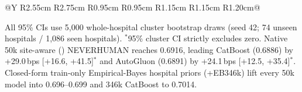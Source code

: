 \begin{table}[t]
\begin{tabularx}{\textwidth}{@{}Y R{2.55cm} R{2.75cm} R{0.95cm} R{0.95cm} R{1.15cm} R{1.15cm} R{1.20cm}@{}}
\bottomrule
\end{tabularx}
\vspace{2pt}
{\raggedright\sffamily\fontsize{6.8}{8.5}\selectfont\color{sub}All 95\% CIs use 5,000 whole-hospital cluster bootstrap draws (seed 42; 74 unseen hospitals / 1,086 seen hospitals). $^\ast$95\% cluster CI strictly excludes zero. Native 50k site-aware () NEVERHUMAN reaches 0.6916, leading CatBoost  (0.6886) by +29.0\,bps [+16.6, +41.5]${}^\ast$ and AutoGluon  (0.6891) by +24.1\,bps [+12.5, +35.4]${}^\ast$. Closed-form train-only Empirical-Bayes hospital priors (+EB346k) lift every 50k model into 0.696--0.699 and 346k CatBoost to 0.7014.\par}
\end{table}
